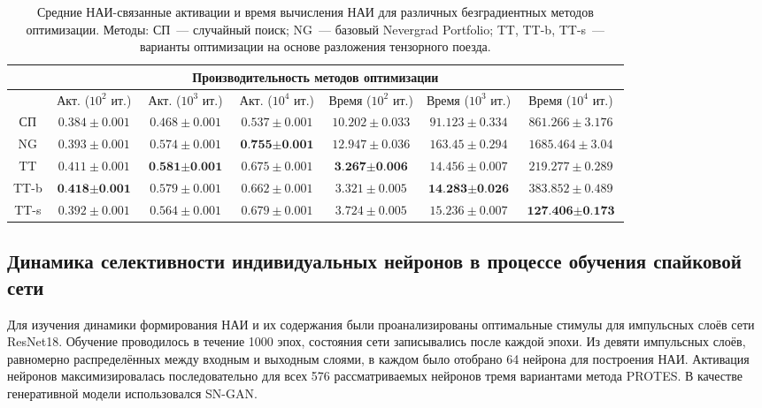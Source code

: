 \begin{table}[ht]
\scriptsize
\centering
\begin{tabular}{|c|c|c|c|c|c|c|}
 \hline
 \multicolumn{7}{|c|}{Производительность методов оптимизации} \\
 \hline
~ & Акт. ($10^2$ ит.) &Акт. ($10^3$ ит.) & Акт. ($10^4$ ит.) & Время ($10^2$ ит.) &Время ($10^3$ ит.) & Время ($10^4$ ит.)\\
 \hline
 СП & $0.384\!\pm\!0.001$ & $0.468\!\pm\!0.001$ & $0.537\!\pm\!0.001$ & $10.202\!\pm\!0.033$ & $91.123\!\pm\!0.334$ & $861.266\!\pm\!3.176$  \\
 \hline
 NG & $0.393\!\pm\!0.001$ & $0.574\!\pm\!0.001$ & $\textbf{0.755}\!\pm\!\textbf{0.001}$ & $12.947\!\pm\!0.036$ & $163.45\!\pm\!0.294$ & $1685.464\!\pm\!3.04$ \\
 \hline
 TT & $0.411\!\pm\!0.001$ & $\textbf{0.581}\!\pm\!\textbf{0.001}$ & $0.675\!\pm\!0.001$ & $\textbf{3.267}\!\pm\!\textbf{0.006}$ & $14.456\!\pm\!0.007$ & $219.277\!\pm\!0.289$\\
 \hline
 TT-b & $\textbf{0.418}\!\pm\!\textbf{0.001}$ & $0.579\!\pm\!0.001$ & $0.662\!\pm\!0.001$ & $3.321\!\pm\!0.005$ & $\textbf{14.283}\!\pm\!\textbf{0.026}$ & $383.852\!\pm\!0.489$\\
 \hline
 TT-s & $0.392\!\pm\!0.001$ & $0.564\!\pm\!0.001$ & $0.679\!\pm\!0.001$ & $3.724\!\pm\!0.005$ & $15.236\!\pm\!0.007$ & $\textbf{127.406}\!\pm\!\textbf{0.173}$\\
 \hline
\end{tabular}
\caption{Средние НАИ-связанные активации и время вычисления НАИ для различных безградиентных методов оптимизации. Методы: СП~--- случайный поиск; NG~--- базовый Nevergrad Portfolio; TT, TT-b, TT-s~--- варианты оптимизации на основе разложения тензорного поезда.}
\label{table:am_methods}
\end{table}


\subsection{Динамика селективности индивидуальных нейронов в процессе обучения спайковой сети}\label{sec:mango_selectivity}

Для изучения динамики формирования НАИ и их содержания были проанализированы оптимальные стимулы для импульсных слоёв сети ResNet18. Обучение проводилось в течение 1000 эпох, состояния сети записывались после каждой эпохи. Из девяти импульсных слоёв, равномерно распределённых между входным и выходным слоями, в каждом было отобрано 64 нейрона для построения НАИ. Активация нейронов максимизировалась последовательно для всех 576 рассматриваемых нейронов тремя вариантами метода PROTES. В качестве генеративной модели использовался SN-GAN.

